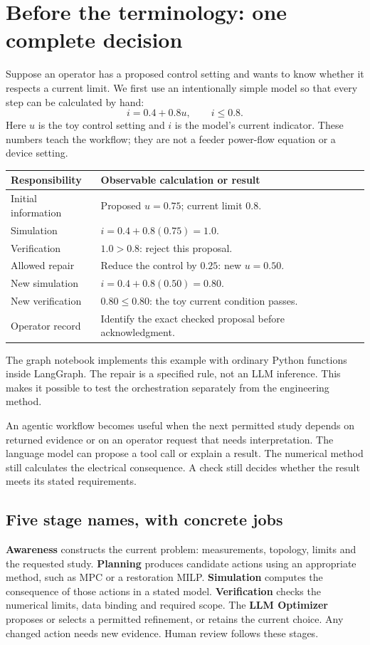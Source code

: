 \documentclass[11pt]{article}
\begin{document}
\section*{Before the terminology: one complete decision}
Suppose an operator has a proposed control setting and wants to know whether it respects a current limit. We first use an intentionally simple model so that every step can be calculated by hand:
\[
 i=0.4+0.8u,\qquad i\leq0.8.
\]
Here $u$ is the toy control setting and $i$ is the model's current indicator. These numbers teach the workflow; they are not a feeder power-flow equation or a device setting.
\begin{center}\begin{tabular}{p{.24\linewidth}p{.62\linewidth}}\toprule
Responsibility & Observable calculation or result\\\midrule
Initial information & Proposed $u=0.75$; current limit $0.8$.\\
Simulation & $i=0.4+0.8(0.75)=1.0$.\\
Verification & $1.0>0.8$: reject this proposal.\\
Allowed repair & Reduce the control by $0.25$: new $u=0.50$.\\
New simulation & $i=0.4+0.8(0.50)=0.80$.\\
New verification & $0.80\leq0.80$: the toy current condition passes.\\
Operator record & Identify the exact checked proposal before acknowledgment.\\\bottomrule
\end{tabular}\end{center}
The graph notebook implements this example with ordinary Python functions inside LangGraph. The repair is a specified rule, not an LLM inference. This makes it possible to test the orchestration separately from the engineering method.

An agentic workflow becomes useful when the next permitted study depends on returned evidence or on an operator request that needs interpretation. The language model can propose a tool call or explain a result. The numerical method still calculates the electrical consequence. A check still decides whether the result meets its stated requirements.

\subsection*{Five stage names, with concrete jobs}
\textbf{Awareness} constructs the current problem: measurements, topology, limits and the requested study. \textbf{Planning} produces candidate actions using an appropriate method, such as MPC or a restoration MILP. \textbf{Simulation} computes the consequence of those actions in a stated model. \textbf{Verification} checks the numerical limits, data binding and required scope. The \textbf{LLM Optimizer} proposes or selects a permitted refinement, or retains the current choice. Any changed action needs new evidence. Human review follows these stages.
\end{document}
